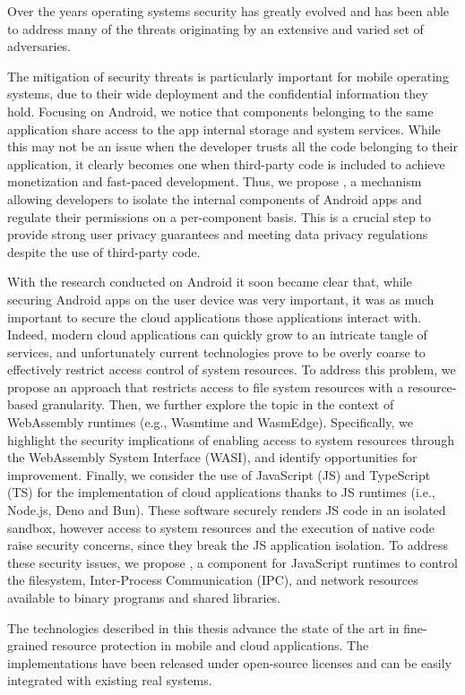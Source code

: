 Over the years operating systems security has greatly evolved and has
been able to address many of the threats originating by an extensive
and varied set of adversaries.

The mitigation of security threats is particularly important for
mobile operating systems, due to their wide deployment and the
confidential information they hold. Focusing on Android, we notice
that components belonging to the same application share access to the
app internal storage and system services. While this may not be an
issue when the developer trusts all the code belonging to their
application, it clearly becomes one when third-party code is included
to achieve monetization and fast-paced development. Thus, we propose
\seapp, a mechanism allowing developers to isolate the internal
components of Android apps and regulate their permissions on a
per-component basis. This is a crucial step to provide strong user
privacy guarantees and meeting data privacy regulations despite the
use of third-party code.

With the research conducted on Android it soon became clear that,
while securing Android apps on the user device was very important,
it was as much important to secure the cloud applications those
applications interact with. Indeed, modern cloud applications can
quickly grow to an intricate tangle of services, and unfortunately
current technologies prove to be overly coarse to effectively restrict
access control of system resources. To address this problem, we propose
an approach that restricts access to file system resources with a
resource-based granularity. Then, we further explore the topic in the
context of WebAssembly runtimes (e.g., Wasmtime and WasmEdge).
Specifically, we highlight the security implications of enabling
access to system resources through the WebAssembly System Interface
(WASI), and identify opportunities for improvement.
Finally, we consider the use of JavaScript (JS) and TypeScript (TS)
for the implementation of cloud applications thanks to JS runtimes
(i.e., Node.js, Deno and Bun). These software securely renders JS code
in an isolated sandbox, however access to system resources and the
execution of native code raise security concerns, since they break the
JS application isolation. To address these security issues, we propose
\natisand, a component for JavaScript runtimes to control the
filesystem, Inter-Process Communication (IPC), and network resources
available to binary programs and shared libraries.

The technologies described in this thesis advance the state of the art
in fine-grained resource protection in mobile and cloud applications.
The implementations have been released under open-source licenses and
can be easily integrated with existing real systems.
